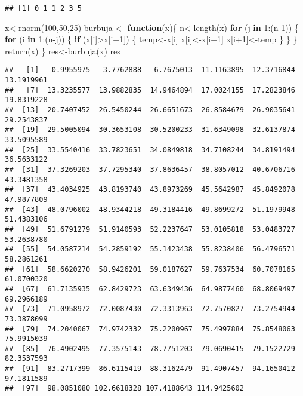 \documentclass[]{elsarticle} %
\newenvironment{Shaded}{\begin{snugshade}}{\end{snugshade}}
\newcommand{\ControlFlowTok}[1]{\textcolor[rgb]{0.13,0.29,0.53}{\textbf{#1}}}
\newcommand{\DecValTok}[1]{\textcolor[rgb]{0.00,0.00,0.81}{#1}}
\newcommand{\FunctionTok}[1]{\textcolor[rgb]{0.00,0.00,0.00}{#1}}
\newcommand{\NormalTok}[1]{#1}
\newcommand{\OtherTok}[1]{\textcolor[rgb]{0.56,0.35,0.01}{#1}}
\newcommand{\SpecialCharTok}[1]{\textcolor[rgb]{0.00,0.00,0.00}{#1}}
\begin{document}
\begin{verbatim}
## [1] 0 1 1 2 3 5
\end{verbatim}

\begin{Shaded}
\begin{Highlighting}[]
\NormalTok{x}\OtherTok{\textless{}{-}}\FunctionTok{rnorm}\NormalTok{(}\DecValTok{100}\NormalTok{,}\DecValTok{50}\NormalTok{,}\DecValTok{25}\NormalTok{)}
\NormalTok{burbuja }\OtherTok{\textless{}{-}} \ControlFlowTok{function}\NormalTok{(x)\{}
\NormalTok{  n}\OtherTok{\textless{}{-}}\FunctionTok{length}\NormalTok{(x)}
  \ControlFlowTok{for}\NormalTok{ (j }\ControlFlowTok{in} \DecValTok{1}\SpecialCharTok{:}\NormalTok{(n}\DecValTok{{-}1}\NormalTok{)) \{}
    \ControlFlowTok{for}\NormalTok{ (i }\ControlFlowTok{in} \DecValTok{1}\SpecialCharTok{:}\NormalTok{(n}\SpecialCharTok{{-}}\NormalTok{j)) \{}
      \ControlFlowTok{if}\NormalTok{ (x[i]}\SpecialCharTok{\textgreater{}}\NormalTok{x[i}\SpecialCharTok{+}\DecValTok{1}\NormalTok{]) \{}
\NormalTok{        temp}\OtherTok{\textless{}{-}}\NormalTok{x[i]}
\NormalTok{        x[i]}\OtherTok{\textless{}{-}}\NormalTok{x[i}\SpecialCharTok{+}\DecValTok{1}\NormalTok{]}
\NormalTok{        x[i}\SpecialCharTok{+}\DecValTok{1}\NormalTok{]}\OtherTok{\textless{}{-}}\NormalTok{temp}
\NormalTok{      \}}
\NormalTok{    \}}
\NormalTok{  \}}
  \FunctionTok{return}\NormalTok{(x)}
\NormalTok{\}}
\NormalTok{res}\OtherTok{\textless{}{-}}\FunctionTok{burbuja}\NormalTok{(x)}
\NormalTok{res}
\end{Highlighting}
\end{Shaded}

\begin{verbatim}
##   [1]  -0.9955975   3.7762888   6.7675013  11.1163895  12.3716844  13.1919961
##   [7]  13.3235577  13.9882835  14.9464894  17.0024155  17.2823846  19.8319228
##  [13]  20.7407452  26.5450244  26.6651673  26.8584679  26.9035641  29.2543837
##  [19]  29.5005094  30.3653108  30.5200233  31.6349098  32.6137874  33.5095589
##  [25]  33.5540416  33.7823651  34.0849818  34.7108244  34.8191494  36.5633122
##  [31]  37.3269203  37.7295340  37.8636457  38.8057012  40.6706716  43.3481358
##  [37]  43.4034925  43.8193740  43.8973269  45.5642987  45.8492078  47.9877809
##  [43]  48.0796002  48.9344218  49.3184416  49.8699272  51.1979948  51.4383106
##  [49]  51.6791279  51.9140593  52.2237647  53.0105818  53.0483727  53.2638780
##  [55]  54.0587214  54.2859192  55.1423438  55.8238406  56.4796571  58.2861261
##  [61]  58.6620270  58.9426201  59.0187627  59.7637534  60.7078165  61.0700320
##  [67]  61.7135935  62.8429723  63.6349436  64.9877460  68.8069497  69.2966189
##  [73]  71.0958972  72.0087430  72.3313963  72.7570827  73.2754944  73.3878099
##  [79]  74.2040067  74.9742332  75.2200967  75.4997884  75.8548063  75.9915039
##  [85]  76.4902495  77.3575143  78.7751203  79.0690415  79.1522729  82.3537593
##  [91]  83.2717399  86.6115419  88.3162479  91.4907457  94.1650412  97.1811589
##  [97]  98.0851080 102.6618328 107.4188643 114.9425602
\end{verbatim}
\end{document}
